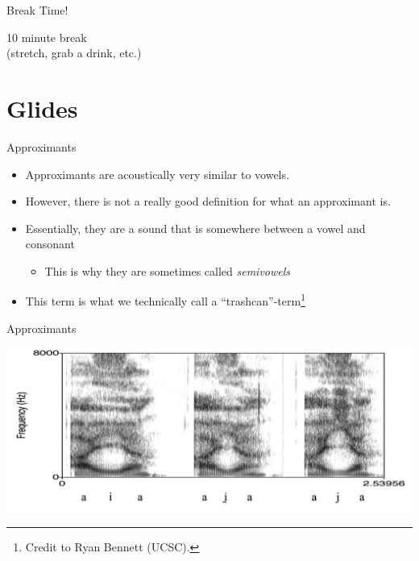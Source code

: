 \documentclass[professionalfonts]{beamer}
\begin{document}
\begin{frame}{Break Time!}
    \begin{center}
        \Huge 10 minute break \\ (stretch, grab a drink, etc.)
    \end{center}
\end{frame}

\section*{Glides}

\begin{frame}{Approximants}
    \begin{itemize}
        \item Approximants are acoustically very similar to vowels. 
        \item However, there is not a really good definition for what an approximant is. 
        \item Essentially, they are a sound that is somewhere between a vowel and consonant 
        \begin{itemize}
            \item This is why they are sometimes called \textit{semivowels}
        \end{itemize}
        \item This term is what we technically call a ``trashcan''-term\footnote{Credit to Ryan Bennett (UCSC).}
    \end{itemize}
\end{frame}

\begin{frame}{Approximants}
    \begin{center}
        \includegraphics[width = \textwidth]{figs/padgett-2008.jpg}
    \end{center}
\end{frame}
\end{document}
